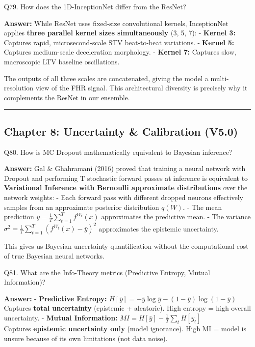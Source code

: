 \documentclass[11pt,a4paper]{article}
\begin{document}
\begin{questionbox}
Q79. How does the 1D-InceptionNet differ from the ResNet?
\end{questionbox}
\textbf{Answer:} While ResNet uses fixed-size convolutional kernels,
InceptionNet applies \textbf{three parallel kernel sizes simultaneously}
(3, 5, 7): - \textbf{Kernel 3:} Captures rapid, microsecond-scale STV
beat-to-beat variations. - \textbf{Kernel 5:} Captures medium-scale
deceleration morphology. - \textbf{Kernel 7:} Captures slow, macroscopic
LTV baseline oscillations.

The outputs of all three scales are concatenated, giving the model a
multi-resolution view of the FHR signal. This architectural diversity is
precisely why it complements the ResNet in our ensemble.

\begin{center}\rule{0.5\linewidth}{0.5pt}\end{center}

\subsection{Chapter 8: Uncertainty \& Calibration
(V5.0)}\label{chapter-8-uncertainty-calibration-v5.0}

\begin{questionbox}
Q80. How is MC Dropout mathematically equivalent to Bayesian
inference?
\end{questionbox}
\textbf{Answer:} Gal \& Ghahramani (2016) proved that training a neural
network with Dropout and performing T stochastic forward passes at
inference is equivalent to \textbf{Variational Inference with Bernoulli
approximate distributions} over the network weights: - Each forward pass
with different dropped neurons effectively samples from an approximate
posterior distribution \(q(W)\). - The mean prediction
\(\bar{y} = \frac{1}{T}\sum_{t=1}^{T}f^{W_t}(x)\) approximates the
predictive mean. - The variance
\(\sigma^2 = \frac{1}{T}\sum_{t=1}^{T}(f^{W_t}(x) - \bar{y})^2\)
approximates the epistemic uncertainty.

This gives us Bayesian uncertainty quantification without the
computational cost of true Bayesian neural networks.

\begin{questionbox}
Q81. What are the Info-Theory metrics (Predictive Entropy,
Mutual Information)?
\end{questionbox}
\textbf{Answer:} - \textbf{Predictive Entropy:}
\(H[\bar{y}] = -\bar{y}\log\bar{y} - (1-\bar{y})\log(1-\bar{y})\)\\
Captures \textbf{total uncertainty} (epistemic + aleatoric). High
entropy = high overall uncertainty. - \textbf{Mutual Information:}
\(MI = H[\bar{y}] - \frac{1}{T}\sum_t H[y_t]\)\\
Captures \textbf{epistemic uncertainty only} (model ignorance). High MI
= model is unsure because of its own limitations (not data noise).
\end{document}
